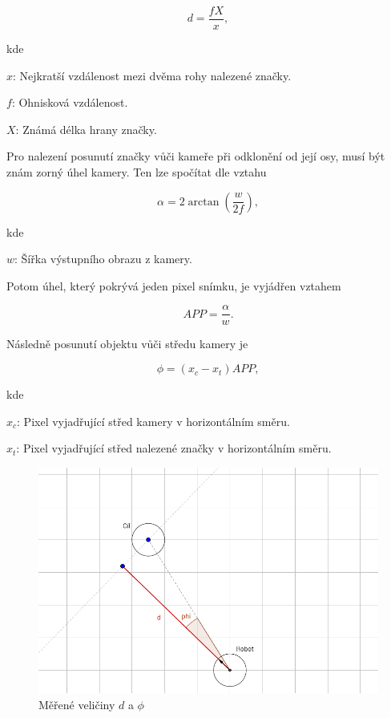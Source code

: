 \documentclass[twoside]{ctuthesis}
\theoremstyle{plain}
\theoremstyle{definition}
\theoremstyle{note}
\begin{document}
\begin{equation}
d = \frac{fX}{x},
\end{equation}

kde

$x$: Nejkratší vzdálenost mezi dvěma rohy nalezené značky.

$f$: Ohnisková vzdálenost.

$X$: Známá délka hrany značky.

Pro nalezení posunutí značky vůči kameře při odklonění od její osy, musí být znám zorný úhel kamery. Ten lze spočítat dle vztahu

\begin{equation}
\alpha = 2\arctan\left(\frac{w}{2f}\right),
\end{equation}

kde

$w$: Šířka výstupního obrazu z kamery.

Potom úhel, který pokrývá jeden pixel snímku, je vyjádřen vztahem

\begin{equation}
APP = \frac{\alpha}{w}.
\end{equation}

Následně posunutí objektu vůči středu kamery je 

\begin{equation}
\phi = (x_c - x_t)APP,
\end{equation}

kde 

$x_c$: Pixel vyjadřující střed kamery v horizontálním směru.

$x_t$: Pixel vyjadřující střed nalezené značky v horizontálním směru.

\begin{figure}
	\caption{Měřené veličiny $d$ a $\phi$}
	
	\label{mereni}
	\includegraphics[width=1\textwidth]{images/2/mereni.png}
\end{figure}
\end{document}
